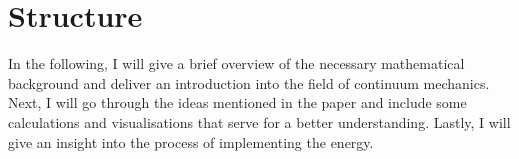 \section{Structure}
In the following, I will give a brief overview of the necessary mathematical background and deliver an introduction into the field of continuum mechanics. Next, I will go through the ideas mentioned in the paper and include some calculations and visualisations that serve for a better understanding. Lastly, I will give an insight into the process of implementing the energy.